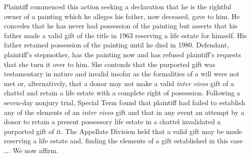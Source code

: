 

Plaintiff commenced this action seeking a declaration that he is the rightful
owner of a painting which he alleges his father, now deceased, gave to him. He
concedes that he has never had possession of the painting but asserts that his
father made a valid gift of the title in 1963 reserving a life estate for
himself. His father retained possession of the painting until he died in 1980.
Defendant, plaintiff's stepmother, has the painting now and has refused
plaintiff's requests that she turn it over to him. She contends that the
purported gift was testamentary in nature and invalid insofar as the
formalities of a will were not met or, alternatively, that a donor may not make
a valid \textit{inter vivos} gift of a chattel and retain a life estate with a
complete right of possession. Following a seven-day nonjury trial, Special Term
found that plaintiff had failed to establish any of the elements of an
\textit{inter vivos} gift and that in any event an attempt by a donor to retain
a present possessory life estate in a chattel invalidated a purported gift of
it. The Appellate Division held that a valid gift may be made reserving a life
estate and, finding the elements of a gift established in this case \dots{}. We
now affirm.

